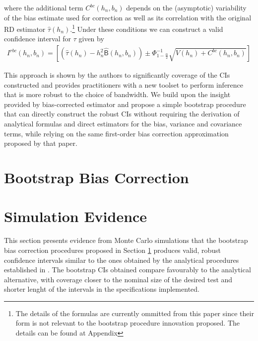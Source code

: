 \documentclass[12pt,fleqn]{article}
\begin{document}
where the additional term $C^{bc}(h_{n}, b_{n})$ depends on the (asymptotic) 
variability of the bias estimate used for correction as well as its correlation 
with the original RD estimator $\hat{\tau}(h_{n})$.\footnote{The details of the 
formulas are currently ommitted from this paper since their form is not relevant
to the bootstrap procedure innovation proposed. The details can be found at 
\cite{calonico2014} Appendix}  Under these conditions we can construct a valid 
confidence interval for $\tau$ given by
 \begin{align}
  I^{rbc}(h_{n}, b_{n})=\left[\left(\hat{\tau}(h_{n})-h_{n}^{2}\hat{\mathsf{B}}
  (h_{n},b_{n})\right)\pm \Phi^{-1}_{1-\frac{\alpha}{2}}\sqrt{V(h_{n})+C^{bc}
  (h_{n}, b_{n})} \right]
 \end{align}

This approach is shown by the authors to significantly coverage of the CIs 
constructed and provides practitioners with a new toolset to perform inference 
that is more robust to the choice of bandwidth. We build upon the insight 
provided by \cite{calonico2014} bias-corrected estimator and propose a simple 
bootstrap procedure that can directly construct the robust CIs without requiring
the derivation of analytical formulas and direct estimators for the bias, 
variance and covariance terms, while relying on the same first-order bias 
correction approximation proposed by that paper.

\section{Bootstrap Bias Correction}\label{boot}

\section{Simulation Evidence}\label{sim}
This section presents evidence from Monte Carlo simulations that the bootstrap bias correction procedures proposed in Section \ref{boot} produces valid, robust confidence intervals similar to the ones obtained by the analytical procedures established in \cite{calonico2014}. The bootstrap CIs obtained compare favourably to the analytical alternative, with coverage closer to the nominal size of the desired test and shorter lenght of the intervals in the specifications implemented.
\end{document}
